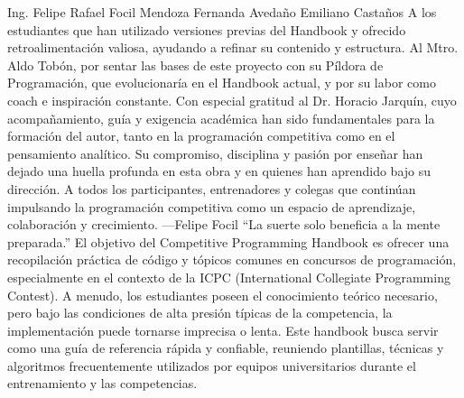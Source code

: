 \markdownRendererSectionEnd 
\markdownRendererSectionEnd \markdownRendererSectionBegin
{}\markdownRendererInterblockSeparator
{}\markdownRendererSectionBegin
\markdownRendererSectionBegin
{}\markdownRendererInterblockSeparator
{}\markdownRendererUlBeginTight
\markdownRendererUlItem Ing. Felipe Rafael Focil Mendoza\markdownRendererUlItemEnd 
\markdownRendererUlEndTight \markdownRendererInterblockSeparator
{}
\markdownRendererSectionEnd \markdownRendererSectionBegin
{}\markdownRendererInterblockSeparator
{}\markdownRendererUlBeginTight
\markdownRendererUlItem Fernanda Avedaño\markdownRendererUlItemEnd 
\markdownRendererUlItem Emiliano Castaños\markdownRendererUlItemEnd 
\markdownRendererUlEndTight \markdownRendererInterblockSeparator
{}
\markdownRendererSectionEnd 
\markdownRendererSectionEnd \markdownRendererSectionBegin
{}\markdownRendererInterblockSeparator
{}A los estudiantes que han utilizado versiones previas del Handbook y ofrecido retroalimentación valiosa, ayudando a refinar su contenido y estructura.\markdownRendererParagraphSeparator
{}Al Mtro. Aldo Tobón, por sentar las bases de este proyecto con su Píldora de Programación, que evolucionaría en el Handbook actual, y por su labor como coach e inspiración constante.\markdownRendererParagraphSeparator
{}Con especial gratitud al Dr. Horacio Jarquín, cuyo acompañamiento, guía y exigencia académica han sido fundamentales para la formación del autor, tanto en la programación competitiva como en el pensamiento analítico. Su compromiso, disciplina y pasión por enseñar han dejado una huella profunda en esta obra y en quienes han aprendido bajo su dirección.\markdownRendererParagraphSeparator
{}A todos los participantes, entrenadores y colegas que continúan impulsando la programación competitiva como un espacio de aprendizaje, colaboración y crecimiento.\markdownRendererParagraphSeparator
{}—Felipe Focil\markdownRendererParagraphSeparator
{}“La suerte solo beneficia a la mente preparada.”\markdownRendererInterblockSeparator
{}
\markdownRendererSectionEnd 
\markdownRendererSectionEnd \markdownRendererSectionBegin
{}\markdownRendererInterblockSeparator
{}El objetivo del Competitive Programming Handbook es ofrecer una recopilación práctica de código y tópicos comunes en concursos de programación, especialmente en el contexto de la ICPC (International Collegiate Programming Contest).\markdownRendererParagraphSeparator
{}A menudo, los estudiantes poseen el conocimiento teórico necesario, pero bajo las condiciones de alta presión típicas de la competencia, la implementación puede tornarse imprecisa o lenta.\markdownRendererParagraphSeparator
{}Este handbook busca servir como una guía de referencia rápida y confiable, reuniendo plantillas, técnicas y algoritmos frecuentemente utilizados por equipos universitarios durante el entrenamiento y las competencias.
\markdownRendererSectionEnd \markdownRendererDocumentEnd